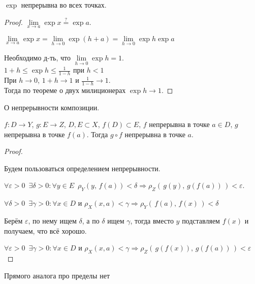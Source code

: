 \begin{theorem-non}
    $\exp$ непрерывна во всех точках.
\end{theorem-non}

\begin{proof}
    $\underset{x \rightarrow a}{\lim} \exp x \overset{?}{=} \exp a$.

    $\underset{x \rightarrow a}{\lim} \exp x =
    \underset{h \rightarrow 0}{\lim} \exp (h + a) =
    \underset{h \rightarrow 0}{\lim} \exp h \exp a$

    Необходимо д-ть, что $\underset{h \rightarrow 0}{\lim} \exp h = 1$. \\
    $1 + h \leqslant \exp h \leqslant \frac{1}{1 - h}$ при $h < 1$ \\
    При $h \rightarrow 0$, $1 + h \rightarrow 1$ и $\frac{1}{1 - h}
    \rightarrow 1$.\\
    Тогда по теореме о двух милиционерах $\exp h \rightarrow 1$.
\end{proof}

\begin{theorem-non}
    О непрерывности композиции.
\end{theorem-non}

$f : D \rightarrow Y$, $g : E \rightarrow Z$, $D, E \subset X$,
$f(D) \subset E$, $f$ непрерывна в точке $a \in D$, $g$ непрерывна в
точке $f(a)$. Тогда $g \circ f$ непрерывна в точке $a$.

\begin{proof} $ $
    
    Будем пользоваться определением непрерывности.

    $\forall \varepsilon > 0 \,\,\, \exists \delta > 0 :
    \forall y \in E \,\,\, \rho_Y (y, \,f(a)) < \delta \Rightarrow
    \rho_Z (\, g(y), \, g(f(a)) \,) < \varepsilon$.

    $\forall \delta > 0 \,\,\, \exists \gamma > 0 : 
    \forall x \in D$ и $\rho_X(x, a) < \gamma \Rightarrow
    \rho_Y (\, f(a), \, f(x) \, ) < \delta$

    Берём $\varepsilon$, по нему ищем $\delta$, а по $\delta$ ищем
    $\gamma$, тогда вместо $y$ подставляем $f(x)$ и получаем, что
    всё хорошо.

    $\forall \varepsilon > 0 \,\,\, \exists \gamma > 0 :
    \forall x \in D$ и $\rho_X(x, a) < \gamma \Rightarrow
    \rho_Z (\, g(f(x)), \, g(f(a)) \,) < \varepsilon$
\end{proof}

\notice Прямого аналога про пределы нет

